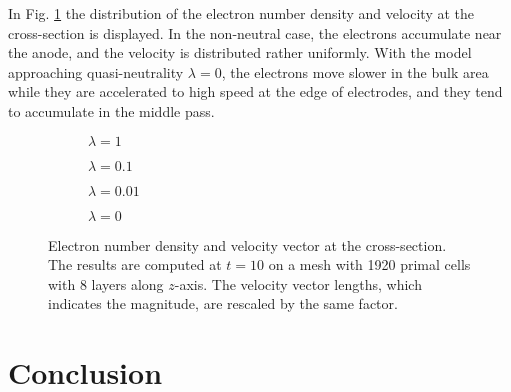 \documentclass{article}
\newcommand{\todo}[1]{\textcolor{blue}{\fbox{\textbf{TODO: #1}}}}
\begin{document}
In Fig. \ref{fig:clip-ne-nue-T_10} the distribution of the electron number density and velocity at the cross-section is displayed. In the non-neutral case, the electrons accumulate near the anode, and the velocity is distributed rather uniformly. With the model approaching quasi-neutrality $\lambda = 0$, the electrons move slower in the bulk area while they are accelerated to high speed at the edge of electrodes, and they tend to accumulate in the middle pass.
\begin{figure}
    \centering
    \begin{subfigure}[b]{0.4\textwidth}
        \centering
        \caption{$\lambda = 1$}
    \end{subfigure}
    \begin{subfigure}[b]{0.4\textwidth}
        \centering
        \caption{$\lambda = 0.1$}
    \end{subfigure}
    \begin{subfigure}[b]{0.4\textwidth}
        \centering
        \caption{$\lambda = 0.01$}
    \end{subfigure}
    \hspace{0.2cm}
    \begin{subfigure}[b]{0.4\textwidth}
        \centering
        \caption{$\lambda = 0$}
    \end{subfigure}
    \caption{Electron number density and velocity vector at the cross-section. The results are computed at $t = 10$ on a mesh with 1920 primal cells with 8 layers along $z$-axis. The velocity vector lengths, which indicates the magnitude, are rescaled by the same factor.}
    \label{fig:clip-ne-nue-T_10}
\end{figure}

\section{Conclusion}
\todo{}
\end{document}
